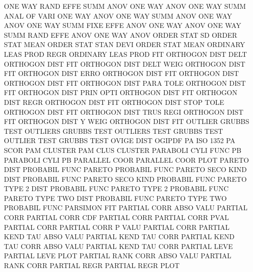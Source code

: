 ONE      WAY  RAND EFFE SUMM ANOV       ONE      WAY  ANOV
ONE      WAY  SUMM ANAL OF   VARI       ONE      WAY  ANOV
ONE      WAY  SUMM ANOV                 ONE      WAY  ANOV
ONE      WAY  SUMM FIXE EFFE ANOV       ONE      WAY  ANOV
ONE      WAY  SUMM RAND EFFE ANOV       ONE      WAY  ANOV
ORDER    STAT SD                        ORDER    STAT MEAN
ORDER    STAT STAN DEVI                 ORDER    STAT MEAN
ORDINARY LEAS PROD REGR                 ORDINARY LEAS PROD FIT
ORTHOGON DIST DELT                      ORTHOGON DIST FIT
ORTHOGON DIST DELT WEIG                 ORTHOGON DIST FIT
ORTHOGON DIST ERRO                      ORTHOGON DIST FIT
ORTHOGON DIST                           ORTHOGON DIST FIT
ORTHOGON DIST PARA TOLE                 ORTHOGON DIST FIT
ORTHOGON DIST PRIN OPTI                 ORTHOGON DIST FIT
ORTHOGON DIST REGR                      ORTHOGON DIST FIT
ORTHOGON DIST STOP TOLE                 ORTHOGON DIST FIT
ORTHOGON DIST TRUS REGI                 ORTHOGON DIST FIT
ORTHOGON DIST Y    WEIG                 ORTHOGON DIST FIT
OUTLIER                                 GRUBBS   TEST
OUTLIERS                                GRUBBS   TEST
OUTLIERS TEST                           GRUBBS   TEST
OUTLIER  TEST                           GRUBBS   TEST
OVIGE    DIST                           OGIPDF
PA                                      ISO      1352 PA   SCOR
PAM                                     CLUSTER
PAM      CLUS                           CLUSTER
PARABOLI CYLI FUNC                      PB
PARABOLI CYLI                           PB
PARALLEL COOR                           PARALLEL COOR PLOT
PARETO   DIST                           PROBABIL FUNC
PARETO                                  PROBABIL FUNC
PARETO   SECO KIND DIST                 PROBABIL FUNC
PARETO   SECO KIND                      PROBABIL FUNC
PARETO   TYPE 2    DIST                 PROBABIL FUNC
PARETO   TYPE 2                         PROBABIL FUNC
PARETO   TYPE TWO  DIST                 PROBABIL FUNC
PARETO   TYPE TWO                       PROBABIL FUNC
PARSIMON                                FIT
PARTIAL  CORR ABSO VALU                 PARTIAL  CORR
PARTIAL  CORR CDF                       PARTIAL  CORR
PARTIAL  CORR PVAL                      PARTIAL  CORR
PARTIAL  CORR P    VALU                 PARTIAL  CORR
PARTIAL  KEND TAU  ABSO VALU            PARTIAL  KEND TAU  CORR
PARTIAL  KEND TAU  CORR ABSO VALU       PARTIAL  KEND TAU  CORR
PARTIAL  LEVE                           PARTIAL  LEVE PLOT
PARTIAL  RANK CORR ABSO VALU            PARTIAL  RANK CORR
PARTIAL  REGR                           PARTIAL  REGR PLOT
